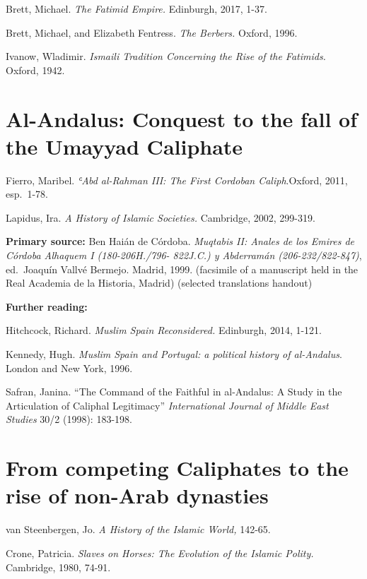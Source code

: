 \documentclass[
]{book}
\begin{document}
Brett, Michael. \emph{The Fatimid Empire.} Edinburgh, 2017, 1-37.

Brett, Michael, and Elizabeth Fentress. \emph{The Berbers.} Oxford, 1996.

Ivanow, Wladimir. \emph{Ismaili Tradition Concerning the Rise of the Fatimids.} Oxford, 1942.

\hypertarget{al-andalus-conquest-to-the-fall-of-the-umayyad-caliphate}{%
\chapter{Al-Andalus: Conquest to the fall of the Umayyad Caliphate}\label{al-andalus-conquest-to-the-fall-of-the-umayyad-caliphate}}

Fierro, Maribel. \emph{ʿAbd al-Rahman III: The First Cordoban Caliph}.Oxford, 2011, esp.~1-78.

Lapidus, Ira. \emph{A History of Islamic Societies.} Cambridge, 2002,
299-319.

\textbf{Primary source:} Ben Haián de Córdoba. \emph{Muqtabis II: Anales de los Emires de Córdoba Alhaquem I (180-206H./796- 822J.C.) y Abderramán (206-232/822-847)}, ed.~Joaquín Vallvé Bermejo. Madrid, 1999. (facsimile of a manuscript held in the Real Academia de la Historia, Madrid) (selected translations handout)

\textbf{Further reading:}

Hitchcock, Richard. \emph{Muslim Spain Reconsidered.} Edinburgh, 2014, 1-121.

Kennedy, Hugh. \emph{Muslim Spain and Portugal: a political history of al-Andalus}. London and New York, 1996.

Safran, Janina. ``The Command of the Faithful in al-Andalus: A Study in
the Articulation of Caliphal Legitimacy'' \emph{International Journal of Middle East Studies} 30/2 (1998): 183-198.

\hypertarget{from-competing-caliphates-to-the-rise-of-non-arab-dynasties}{%
\chapter{From competing Caliphates to the rise of non-Arab dynasties}\label{from-competing-caliphates-to-the-rise-of-non-arab-dynasties}}

van Steenbergen, Jo. \emph{A History of the Islamic World,} 142-65.

Crone, Patricia. \emph{Slaves on Horses: The Evolution of the Islamic Polity.} Cambridge, 1980, 74-91.
\end{document}
